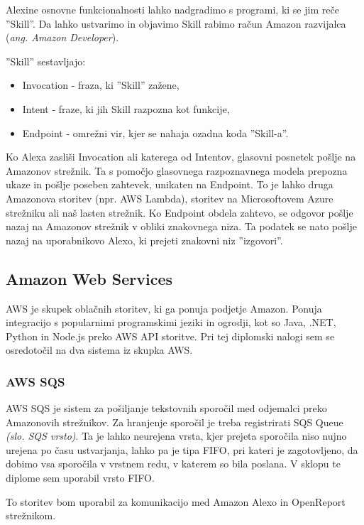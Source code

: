 \documentclass[a4paper, 12pt]{book}
\begin{document}
Alexine osnovne funkcionalnosti lahko nadgradimo s programi, ki se jim reče ''Skill''.
Da lahko ustvarimo in objavimo Skill rabimo račun Amazon razvijalca (\textit{ang. Amazon Developer}).


''Skill'' sestavljajo:
\begin{itemize}
	\item Invocation - fraza, ki ''Skill'' zažene,
	\item Intent - fraze, ki jih Skill razpozna kot funkcije,
	\item Endpoint - omrežni vir, kjer se nahaja ozadna koda ''Skill-a''.
\end{itemize}

Ko Alexa zasliši Invocation ali katerega od Intentov, glasovni posnetek pošlje na Amazonov strežnik.
Ta s pomočjo glasovnega razpoznavnega modela prepozna ukaze in pošlje poseben zahtevek, unikaten na Endpoint.
To je lahko druga Amazonova storitev (npr. AWS Lambda), storitev na Microsoftovem Azure strežniku ali naš lasten strežnik.
Ko Endpoint obdela zahtevo, se odgovor pošlje nazaj na Amazonov strežnik v obliki znakovnega niza.
Ta podatek se nato pošlje nazaj na uporabnikovo Alexo, ki prejeti znakovni niz ''izgovori''.

\subsection{Amazon Web Services}

AWS je skupek oblačnih storitev, ki ga ponuja podjetje Amazon.
Ponuja integracijo s popularnimi programskimi jeziki in ogrodji, kot so Java, .NET, Python in Node.js preko AWS API storitve.
Pri tej diplomski nalogi sem se osredotočil na dva sistema iz skupka AWS.

\subsubsection{AWS SQS}

AWS SQS je sistem za pošiljanje tekstovnih sporočil med odjemalci preko Amazonovih strežnikov.
Za hranjenje sporočil je treba registrirati SQS Queue \textit{(slo. SQS vrsto)}. 
Ta je lahko neurejena vrsta, kjer prejeta sporočila niso nujno urejena po času ustvarjanja, lahko pa je tipa FIFO, pri kateri je zagotovljeno, da dobimo vsa sporočila v vrstnem redu, v katerem so bila poslana.
V sklopu te diplome sem uporabil vrsto FIFO.

To storitev bom uporabil za komunikacijo med Amazon Alexo in OpenReport strežnikom.
\end{document}
